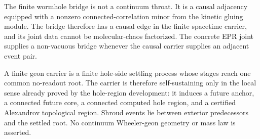 \begin{theorem}\label{thm:finite-wormhole-bridge}\leanok{}
The finite wormhole bridge is not a continuum throat.  It is a causal adjacency
equipped with a nonzero connected-correlation minor from the kinetic gluing
module.  The bridge therefore has a causal edge in the finite spacetime carrier,
and its joint data cannot be molecular-chaos factorized.  The concrete EPR
joint supplies a non-vacuous bridge whenever the causal carrier supplies an
adjacent event pair.
\end{theorem}

\begin{theorem}\label{thm:finite-geon-carrier}\leanok{}
A finite geon carrier is a finite hole-side settling process whose stages reach
one common no-readout root.  The carrier is therefore self-sustaining only in
the local sense already proved by the hole-region development: it induces a
future anchor, a connected future core, a connected computed hole region, and a
certified Alexandrov topological region.  Shroud events lie between exterior
predecessors and the settled root.  No continuum Wheeler-geon geometry or mass
law is asserted.
\end{theorem}

